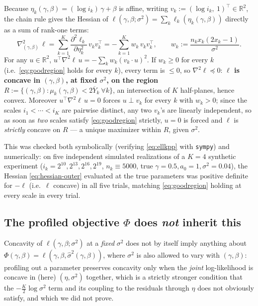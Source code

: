 \documentclass[11pt]{article}
\begin{document}
Because $\eta_k(\gamma,\beta) = (\log i_k)\,\gamma + \beta$ is affine, writing
$v_k := (\log i_k,\ 1)^\top \in \mathbb{R}^2$, the chain rule gives the
Hessian of $\ell(\gamma,\beta;\sigma^2) = \sum_k \ell_k(\eta_k(\gamma,\beta))$
directly as a sum of rank-one terms:
\begin{equation}
\label{eq:hessian-outer}
  \nabla^2_{(\gamma,\beta)}\, \ell
  = \sum_{k=1}^K \frac{\partial^2 \ell_k}{\partial \eta_k^2}\, v_k v_k^\top
  = -\sum_{k=1}^K w_k\, v_k v_k^\top,
  \qquad w_k := \frac{n_k x_k(2x_k-1)}{\sigma^2}.
\end{equation}
For any $u \in \mathbb{R}^2$, $u^\top \nabla^2\ell\, u = -\sum_k w_k (v_k\cdot u)^2$.
If $w_k \ge 0$ for every $k$ (i.e.\ \eqref{eq:goodregion} holds for every
$k$), every term is $\le 0$, so $\nabla^2 \ell \preceq 0$: \textbf{$\ell$ is
concave in $(\gamma,\beta)$, at fixed $\sigma^2$, on the region}
$R := \{(\gamma,\beta) : \mu_k(\gamma,\beta) < 2\overline{Y}_k \ \forall k\}$,
an intersection of $K$ half-planes, hence convex. Moreover $u^\top\nabla^2\ell\, u = 0$
forces $u \perp v_k$ for every $k$ with $w_k>0$; since the scales
$i_1<\cdots<i_K$ are pairwise distinct, any two $v_k$'s are linearly
independent, so as soon as \emph{two} scales satisfy \eqref{eq:goodregion}
strictly, $u=0$ is forced and $\ell$ is \emph{strictly} concave on $R$ --- a
unique maximizer within $R$, given $\sigma^2$.

This was checked both symbolically (verifying \eqref{eq:ellkpp} with
\texttt{sympy}) and numerically: on five independent simulated realizations
of a $K=4$ synthetic experiment ($i_k=2^{10},2^{13},2^{16},2^{19}$,
$n_k\equiv5000$, true $\gamma=0.5,a_0=1,\sigma^2=0.04$), the Hessian
\eqref{eq:hessian-outer} evaluated at the true parameters was positive
definite for $-\ell$ (i.e.\ $\ell$ concave) in all five trials, matching
\eqref{eq:goodregion} holding at every scale in every trial.

\subsection{The profiled objective \texorpdfstring{$\Phi$}{Phi} does \emph{not} inherit this}

Concavity of $\ell(\gamma,\beta;\sigma^2)$ at a \emph{fixed} $\sigma^2$ does
not by itself imply anything about $\Phi(\gamma,\beta) = \ell(\gamma,\beta,\hat\sigma^2(\gamma,\beta))$,
where $\sigma^2$ is also allowed to vary with $(\gamma,\beta)$: profiling out
a parameter preserves concavity only when the \emph{joint} log-likelihood is
concave in (here) $(\eta,\sigma^2)$ together, which is a strictly stronger
condition that the $-\frac{K}{2}\log\sigma^2$ term and its coupling to the
residuals through $\eta$ does not obviously satisfy, and which we did not
prove.
\end{document}
